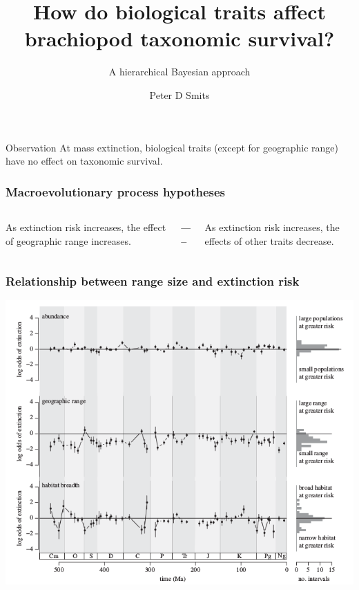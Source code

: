 \documentclass{beamer}
\title{How do biological traits affect brachiopod taxonomic survival?}
\subtitle{A hierarchical Bayesian approach}
\author{Peter D Smits}
\institute{Committee on Evolutionary Biology, University of Chicago}
\date{}
\begin{document}
\begin{frame}
  \maketitle
\end{frame}

\begin{frame}
  \begin{alertblock}{Observation}
    At mass extinction, biological traits (except for geographic range) have no effect on taxonomic survival.
  \end{alertblock}
\end{frame}

\begin{frame}
  \frametitle{Macroevolutionary process hypotheses}
  \begin{columns}
    \begin{column}{0.45\textwidth}
      As extinction risk increases, the effect of geographic range increases.
    \end{column}
    \begin{column}{0.05\textwidth}
      \textbf{-----}
    \end{column}
    \begin{column}{0.45\textwidth}
      As extinction risk increases, the effects of other traits decrease.
    \end{column}
  \end{columns}
\end{frame}

\begin{frame}
  \frametitle{Relationship between range size and extinction risk}
  \begin{center}
    \includegraphics[width = \textwidth,height = 0.8\textheight,keepaspectratio = true]{figure/harnik_rarity}
  \end{center}
  
  \tiny{}
\end{frame}
\end{document}
